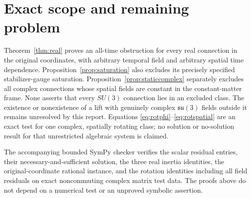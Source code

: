 \documentclass[11pt]{article}
\newcommand{\su}{\mathfrak{su}}
\begin{document}
\section{Exact scope and remaining problem}

Theorem~\ref{thm:real} proves an all-time obstruction for every real
connection in the original coordinates, with arbitrary temporal field
and arbitrary spatial time dependence. Proposition~\ref{prop:saturation}
also excludes its precisely specified stabilizer-gauge saturation.
Proposition~\ref{prop:staticcomplex} separately excludes all complex
connections whose spatial fields are constant in the constant-matter frame.
None asserts that every $SU(3)$ connection lies in an excluded class.
The existence or nonexistence of a lift with genuinely complex
$\su(3)$ fields outside it remains unresolved by this report.
Equations \eqref{eq:rotphi}--\eqref{eq:rotspatial} are an exact test for
one complex, spatially rotating class; no solution or no-solution result
for that unrestricted algebraic system is claimed.

The accompanying bounded SymPy checker verifies the scalar residual
entries, their necessary-and-sufficient solution, the three real inertia
identities, the original-coordinate rational instance, and the rotation
identities including all field residuals on exact noncommuting complex
matrix test data. The proofs above do not depend on a numerical test or
an unproved symbolic assertion.
\end{document}
